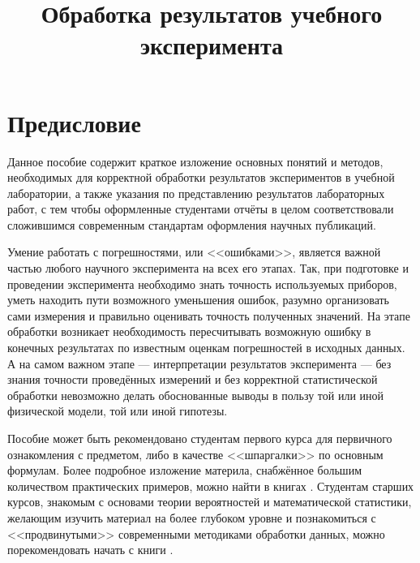 \documentclass[a5paper,10pt,oneside]{report}
\begin{document}
\title{Обработка результатов учебного эксперимента}


\maketitle
\tableofcontents

\listoftodos

\chapter*{Предисловие}
    Данное пособие содержит краткое изложение основных понятий и методов,
    необходимых для корректной обработки результатов экспериментов в учебной
    лаборатории, а также указания по представлению результатов лабораторных
    работ, с тем чтобы оформленные студентами отчёты в целом соответствовали
    сложившимся современным стандартам оформления научных публикаций.

    Умение работать с погрешностями, или <<ошибками>>,
    является важной частью любого научного эксперимента на всех его этапах.
    Так, при подготовке и проведении эксперимента необходимо знать точность
    используемых приборов, уметь находить пути возможного уменьшения ошибок,
    разумно организовать сами измерения и правильно оценивать точность
    полученных значений. На этапе обработки возникает необходимость пересчитывать
    возможную ошибку в конечных результатах по известным оценкам погрешностей
    в исходных данных. А на самом важном этапе --- интерпретации
    результатов эксперимента --- без знания точности проведённых
    измерений и без корректной статистической обработки невозможно делать
    обоснованные выводы в пользу той или иной физической модели, той или
    иной гипотезы.

    Пособие может быть рекомендовано студентам первого курса для первичного
    ознакомления с предметом, либо в качестве <<шпаргалки>>
    по основным формулам. Более подробное изложение материла, снабжённое
    большим количеством практических примеров, можно найти в книгах
    \cite{taylor,squires,zaidel}. Студентам старших курсов, знакомым
    с основами теории вероятностей и математической статистики, желающим
    изучить материал на более глубоком уровне и познакомиться с <<продвинутыми>>
    современными методиками обработки данных, можно порекомендовать начать
    с книги \cite{hudson}.
\end{document}
